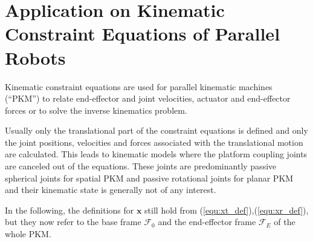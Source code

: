 \documentclass[twocolumn,10pt]{IFTOMM}
\newcommand{\bm}[1]{\boldsymbol{#1}}
\newcommand{\ks}[1]{{\mathcal{F}}_{#1}}
\begin{document}
\section{Application on Kinematic Constraint Equations of Parallel Robots}
\label{sec:ParRobKinConstr}

Kinematic constraint equations are used for parallel kinematic machines (``PKM'') to relate end-effector and joint velocities, actuator and end-effector forces or to solve the inverse kinematics problem.

Usually only the translational part of the constraint equations is defined and only the joint positions, velocities and forces associated with the translational motion are calculated.
This leads to kinematic models where the platform coupling joints are canceled out of the equations. These joints are predominantly passive spherical joints for spatial PKM and passive rotational joints for planar PKM and their kinematic state is generally not of any interest.

In the following, the definitions for $\bm{x}$ still hold from  (\ref{equ:xt_def}),(\ref{equ:xr_def}), but they now refer to the base frame $\ks{0}$ and the end-effector frame $\ks{E}$ of the whole PKM.
\end{document}
